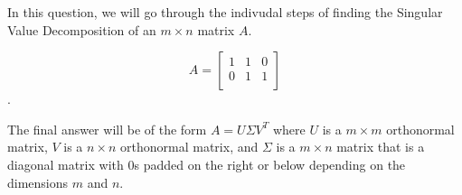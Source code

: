 

In this question, we will go through the indivudal steps of finding the Singular Value Decomposition of an $m \times n$ matrix $A.$

$$A = \begin{bmatrix}
    1 & 1 & 0 \\
    0 & 1 & 1 \\
  \end{bmatrix}$$. 

The final answer will be of the form $A = U \Sigma V^{T}$ where $U$ is a $m \times m$ orthonormal matrix, $V$ is a $n \times n$ orthonormal matrix, and $\Sigma$ is a $m \times n$ matrix that is a diagonal matrix with $0$s padded on the right or below depending on the dimensions $m$ and $n.$

